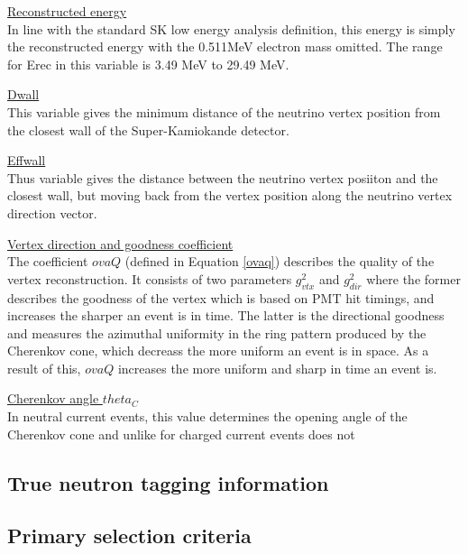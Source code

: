  \underline{Reconstructed energy}\\
 In line with the standard SK low energy analysis definition, this energy is simply the reconstructed energy with the 0.511MeV electron mass omitted. The range for Erec in this variable is 3.49 MeV to 29.49 MeV.
\newline

 \underline{Dwall}\\
 This variable gives the minimum distance of the neutrino vertex position from the closest wall of the Super-Kamiokande detector.
\newline

 \underline{Effwall}\\
 Thus variable gives the distance between the neutrino vertex posiiton and the closest wall, but moving back from the vertex position along the neutrino vertex direction vector.
\newline

 \underline{Vertex direction and goodness coefficient}\\
 The coefficient $ovaQ$ (defined in Equation \ref{ovaq}) describes the quality of the vertex reconstruction. It consists of two parameters $g^2_{vtx}$ and $g^2_{dir}$ where the former describes the goodness of the vertex which is based on PMT hit timings, and increases the sharper an event is in time. The latter is the directional goodness and measures the azimuthal uniformity in the ring pattern produced by the Cherenkov cone, which decreass the more uniform an event is in space. As a result of this, $ovaQ$ increases the more uniform and sharp in time an event is.
\newline

 \underline{Cherenkov angle $theta_{C}$}\\
 In neutral current events, this value determines the opening angle of the Cherenkov cone and unlike for charged current events does not 
\newline

\subsection{True neutron tagging information}
\subsection{Primary selection criteria}

